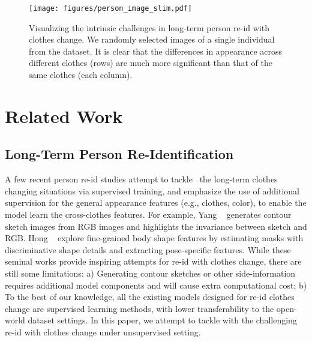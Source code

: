 \documentclass[10pt,twocolumn,letterpaper]{article}
\newcommand{\reid}{re-id}
\newcommand{\name}{\text{Deepchange}}
\def\eg{e.g.}
\begin{document}
\begin{figure}[!thb]
\center
{\texttt{[image: figures/person\_image\_slim.pdf]}}\\
\caption{Visualizing the intrinsic challenges in long-term person \reid{} with clothes change. We randomly selected  images of a single individual from the \name{} \cite{Deepchange} dataset.
It is clear that the differences in appearance across different clothes (rows) are much more significant than that of the same clothes (each column).
}
\label{fig:clothes-change}
\vspace{-10pt}
\end{figure}



\section{Related Work}
\label{sec:related-work}
\subsection{Long-Term Person Re-Identification}
A few recent person \reid{} studies attempt  to tackle~\cite{Change:1,Change:2,change:3,change:4,change:5,change:6,change:7} the long-term clothes changing situations via supervised training, and emphasize the use of additional supervision for the general appearance features (\eg, clothes, color), to  enable  the model learn the cross-clothes features. For example, 
Yang \etal~\cite{Change:1} generates contour sketch images from RGB images and highlights the invariance between sketch and RGB.
Hong \etal~\cite{change:8} explore fine-grained body shape features by estimating masks with discriminative shape details and extracting pose-specific features. 
While these seminal works provide inspiring attempts for \reid{} with clothes change, there are still some limitations: 
a) Generating contour sketches or other side-information requires additional model components and will cause extra computational cost; 
b) To the best of our knowledge, all the existing models designed for \reid{} clothes change are supervised learning methods, with lower transferability to the open-world dataset settings. 
In this paper, we attempt to tackle with the challenging \reid{} with clothes change under unsupervised setting. 
\end{document}
